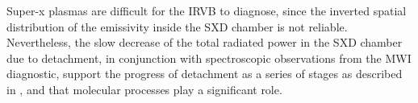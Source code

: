 Super-x plasmas are difficult for the IRVB to diagnose, since the inverted spatial distribution of the emissivity inside the SXD chamber is not reliable. Nevertheless, the slow decrease of the total radiated power in the SXD chamber due to detachment, in conjunction with spectroscopic observations from the MWI diagnostic, support the progress of detachment as a series of stages as described in \cite{Verhaegh2022}, and that molecular processes play a significant role.